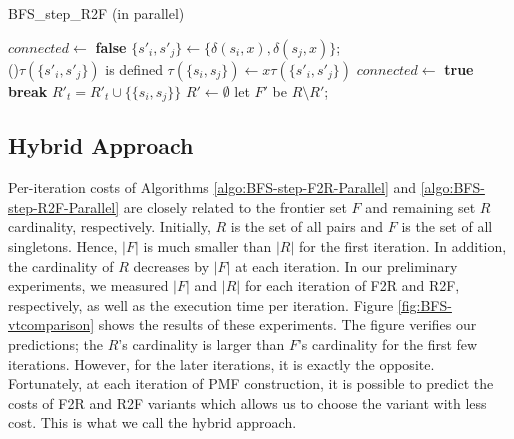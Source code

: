 \documentclass[12pt]{article}
\begin{document}
\begin{algorithm}[ht]
	\caption{BFS\_step\_R2F (in parallel)}
	\label{algo:BFS-step-R2F-Parallel}
	
	
		{
			$connected  \longleftarrow $ {\bf false}\;
			{
				$\{ s'_i, s'_j \}\longleftarrow \{ \delta(s_i,x),\delta(s_j,x) \}$; \\ 

				\If(){$\tau(\{ s'_i, s'_j \})$ is defined}
				{
					$\tau( \{ s_i, s_j\}) \longleftarrow x \tau(\{ s'_i, s'_j \})$\;
					$connected  \longleftarrow $ {\bf true}\;
					{\bf break}\;
				}
			}
			{
					$R'_t = R'_t \cup \{ \{ s_i, s_j \} \} $\;
			}
		}
		$R' \longleftarrow \emptyset$\;
	let $F'$ be $R \setminus R'$;
\end{algorithm}


\subsection{Hybrid Approach}
\label{sec:BFS-Hybrid-parallel}
Per-iteration costs of Algorithms \ref{algo:BFS-step-F2R-Parallel} and \ref{algo:BFS-step-R2F-Parallel} are closely related to the frontier set $F$ and remaining set $R$ cardinality, respectively. Initially, $R$ is the set of all pairs and $F$ is the set of all singletons. Hence, $|F|$ is much smaller than $|R|$ for the first iteration. In addition, the cardinality of $R$ decreases by $|F|$ at each iteration. In our preliminary experiments, we measured $|F|$ and $|R|$ for each iteration of F2R and R2F, respectively, as well as the execution time per iteration. Figure \ref{fig:BFS-vtcomparison} shows the results of these experiments. The figure verifies our predictions; the $R$'s cardinality is larger than $F$'s cardinality for the first few iterations. However, for the later iterations, it is exactly the opposite. Fortunately, at each iteration of PMF construction, it is possible to predict the costs of F2R and R2F variants which allows us to choose the variant with less cost. This is what we call the hybrid approach. 
\end{document}

